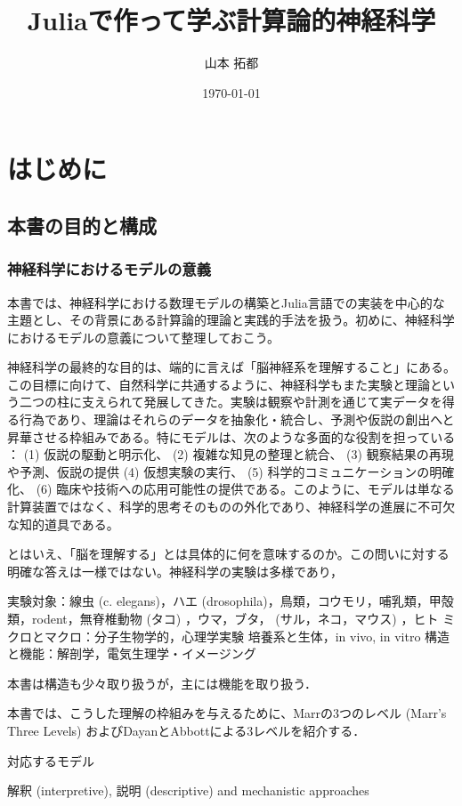 \documentclass[titlepage]{ltjsbook}
\title{\Huge \textbf{Juliaで作って学ぶ計算論的神経科学}}
\author{\huge 山本 拓都}
\date{\huge \today}
\begin{document}
\setcounter{tocdepth}{2}
\tableofcontents
\clearpage
\chapter{はじめに}
\section{本書の目的と構成}
\subsection{神経科学におけるモデルの意義}
本書では、神経科学における数理モデルの構築とJulia言語での実装を中心的な主題とし、その背景にある計算論的理論と実践的手法を扱う。初めに、神経科学におけるモデルの意義について整理しておこう。

神経科学の最終的な目的は、端的に言えば「脳神経系を理解すること」にある。この目標に向けて、自然科学に共通するように、神経科学もまた実験と理論という二つの柱に支えられて発展してきた。実験は観察や計測を通じて実データを得る行為であり、理論はそれらのデータを抽象化・統合し、予測や仮説の創出へと昇華させる枠組みである。特にモデルは、次のような多面的な役割を担っている \citep{Blohm2020-vc,levenstein2023role}：
 (1) 仮説の駆動と明示化、 (2) 複雑な知見の整理と統合、 (3) 観察結果の再現や予測、仮説の提供 (4) 仮想実験の実行、 (5) 科学的コミュニケーションの明確化、 (6) 臨床や技術への応用可能性の提供である。このように、モデルは単なる計算装置ではなく、科学的思考そのものの外化であり、神経科学の進展に不可欠な知的道具である。

とはいえ、「脳を理解する」とは具体的に何を意味するのか。この問いに対する明確な答えは一様ではない。神経科学の実験は多様であり，

実験対象：線虫 (c. elegans)，ハエ (drosophila)，鳥類，コウモリ，哺乳類，甲殻類，rodent，無脊椎動物 (タコ) ，ウマ，ブタ， (サル，ネコ，マウス) ，ヒト
ミクロとマクロ：分子生物学的，心理学実験
培養系と生体，in vivo, in vitro
構造と機能：解剖学，電気生理学・イメージング

本書は構造も少々取り扱うが，主には機能を取り扱う．

本書では、こうした理解の枠組みを与えるために、Marrの3つのレベル (Marr's Three Levels)  \citep{Marr1982-wk} およびDayanとAbbottによる3レベルを紹介する．

対応するモデル


解釈 (interpretive), 説明 (descriptive)  and mechanistic approaches
\end{document}
